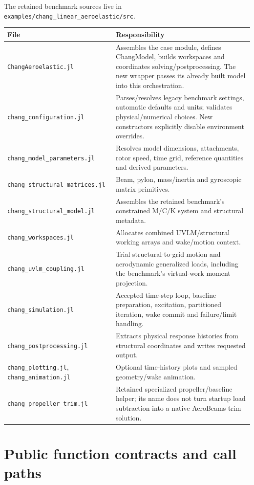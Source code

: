 \documentclass[11pt,a4paper]{article}
\newcommand{\code}{\nolinkurl}
\begin{document}
The retained benchmark sources live in
\code{examples/chang_linear_aeroelastic/src}.
\begin{longtable}{@{}L{.37\linewidth}L{.55\linewidth}@{}}
\toprule File & Responsibility\\\midrule\endhead
\code{ChangAeroelastic.jl} & Assembles the case module, defines ChangModel, builds workspaces and coordinates solving/postprocessing. The new wrapper passes its already built model into this orchestration.\\
\code{chang_configuration.jl} & Parses/resolves legacy benchmark settings, automatic defaults and units; validates physical/numerical choices. New constructors explicitly disable environment overrides.\\
\code{chang_model_parameters.jl} & Resolves model dimensions, attachments, rotor speed, time grid, reference quantities and derived parameters.\\
\code{chang_structural_matrices.jl} & Beam, pylon, mass/inertia and gyroscopic matrix primitives.\\
\code{chang_structural_model.jl} & Assembles the retained benchmark's constrained M/C/K system and structural metadata.\\
\code{chang_workspaces.jl} & Allocates combined UVLM/structural working arrays and wake/motion context.\\
\code{chang_uvlm_coupling.jl} & Trial structural-to-grid motion and aerodynamic generalized loads, including the benchmark's virtual-work moment projection.\\
\code{chang_simulation.jl} & Accepted time-step loop, baseline preparation, excitation, partitioned iteration, wake commit and failure/limit handling.\\
\code{chang_postprocessing.jl} & Extracts physical response histories from structural coordinates and writes requested output.\\
\code{chang_plotting.jl}, \code{chang_animation.jl} & Optional time-history plots and sampled geometry/wake animation.\\
\code{chang_propeller_trim.jl} & Retained specialized propeller/baseline helper; its name does not turn startup load subtraction into a native AeroBeams trim solution.\\
\bottomrule
\end{longtable}

\section{Public function contracts and call paths}
\end{document}
